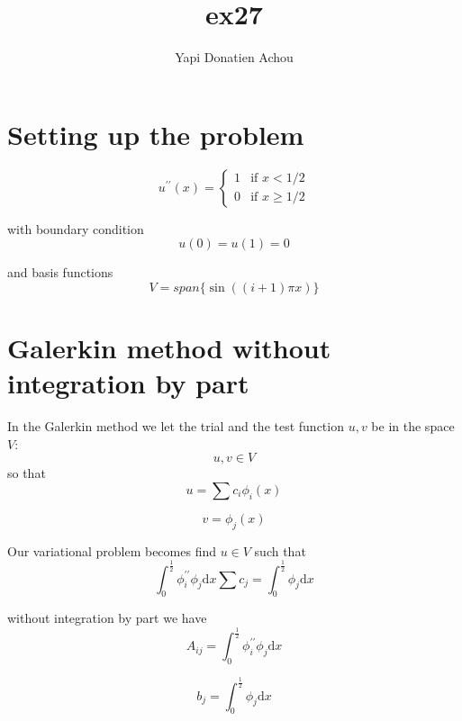 \documentclass[10pt,a4paper]{report}
\begin{document}
\author{Yapi Donatien Achou}
\title{ex27}
\maketitle
\section{Setting up the problem}
\[
 u^{\prime\prime}(x) =
  \begin{cases}
   1 & \text{if } x < 1/2 \\
   0       & \text{if } x \ge 1/2
  \end{cases}
\]

with boundary condition
\begin{equation}
u(0) = u(1) = 0 \nonumber
\end{equation}

and basis functions
\begin{equation}
V = span\{\sin((i+1)\pi x)\} \nonumber
\end{equation}

\section{Galerkin method without integration by part}
In the Galerkin method we let the trial and the test function $u,v$ be in the space $V$:
\begin{equation}
u,v\in V\nonumber
\end{equation}
so that 
\begin{equation}
u = \sum{c_{i}\phi_{i}(x)} \nonumber
\end{equation}

\begin{equation}
v = \phi_{j}(x)\nonumber
\end{equation}

Our variational problem becomes
find $u\in V$ such that
\begin{equation}
\int_{0}^{\frac{1}{2}}\phi_{i}^{\prime\prime}\phi_{j}\mathrm{d}x\sum{c_{j}}= \int_{0}^{\frac{1}{2}}\phi_{j}\mathrm{d}x\nonumber
\end{equation}

without integration by part we have 
\begin{equation}
A_{ij} = \int_{0}^{\frac{1}{2}}\phi_{i}^{\prime\prime}\phi_{j}\mathrm{d}x \nonumber
\end{equation}

\begin{equation}
b_{j} = \int_{0}^{\frac{1}{2}}\phi_{j}\mathrm{d}x\nonumber
\end{equation}
\end{document}
